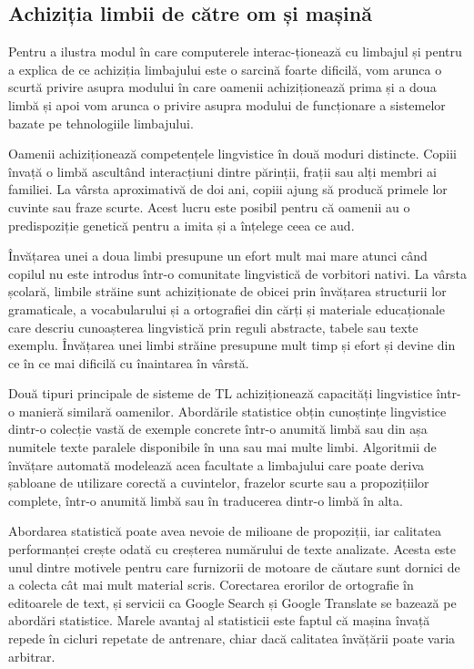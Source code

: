 \documentclass[]{../../metanetpaper}
\begin{document}
\begin{multicols}{2}
\subsection{Achiziția limbii de către om și mașină}

Pentru a ilustra modul în care computerele interac-ționează cu limbajul și pentru a explica de ce achiziția limbajului este o sarcină foarte dificilă, vom arunca o scurtă privire asupra modului în care oamenii achiziționează prima și a doua limbă și apoi vom arunca o privire asupra modului de funcționare a sistemelor bazate pe tehnologiile limbajului.


Oamenii achiziționează competențele lingvistice în două moduri distincte. Copiii învață o limbă ascultând interacțiuni dintre părinții, frații sau alți membri ai familiei. La vârsta aproximativă de doi ani, copiii ajung să producă primele lor cuvinte sau fraze scurte. Acest lucru este posibil pentru că oamenii au o predispoziție genetică pentru a imita și a înțelege ceea ce aud.

Învățarea unei a doua limbi presupune un efort mult mai mare atunci când copilul nu este introdus într-o comunitate lingvistică de vorbitori nativi. La vârsta școlară, limbile străine sunt achiziționate de obicei prin învățarea structurii lor gramaticale, a vocabularului și a ortografiei din cărți și materiale educaționale care descriu cunoașterea lingvistică prin reguli abstracte, tabele sau texte exemplu. Învățarea unei limbi străine presupune mult timp și efort și devine din ce în ce mai dificilă cu înaintarea în vârstă.

Două tipuri principale de sisteme de TL achiziționează capacități lingvistice într-o manieră similară oamenilor. Abordările statistice obțin cunoștințe lingvistice dintr-o colecție vastă de exemple concrete într-o anumită limbă sau din așa numitele texte paralele disponibile în una sau mai multe limbi. Algoritmii de învățare automată modelează acea facultate a limbajului care poate deriva șabloane de utilizare corectă a cuvintelor, frazelor scurte sau a propozițiilor complete, într-o anumită limbă sau în traducerea dintr-o limbă în alta.

Abordarea statistică poate avea nevoie de milioane de propoziții, iar calitatea performanței crește odată cu creșterea numărului de texte analizate. Acesta este unul dintre motivele pentru care furnizorii de motoare de căutare sunt dornici de a colecta cât mai mult material scris. Corectarea erorilor de ortografie în editoarele de text, și servicii ca Google Search și Google Translate se bazează pe abordări statistice. Marele avantaj al statisticii este faptul că mașina învață repede în cicluri repetate de antrenare, chiar dacă calitatea învățării poate varia arbitrar.


\end{multicols}
\end{document}
